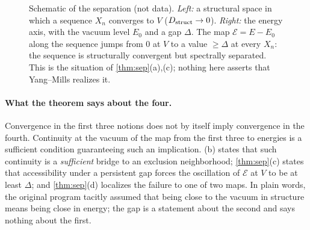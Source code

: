 \documentclass[11pt,a4paper]{article}
\theoremstyle{definition}
\theoremstyle{remark}
\begin{document}
\begin{figure}[t]
\centering
{}
\caption{Schematic of the separation (not data). \emph{Left:} a structural space in which a sequence $X_n$ converges to $V$ ($D_{\rm struct}\to0$). \emph{Right:} the energy axis, with the vacuum level $E_0$ and a gap $\Delta$. The map $\mathcal E=E-E_0$ along the sequence jumps from $0$ at $V$ to a value $\ge\Delta$ at every $X_n$: the sequence is structurally convergent but spectrally separated. This is the situation of \cref{thm:sep}(a),(c); nothing here asserts that Yang--Mills realizes it.}\label{fig:top}
\end{figure}

\paragraph{What the theorem says about the four.} Convergence in the first three notions does not by itself imply convergence in the fourth. Continuity at the vacuum of the map from the first three to energies is a sufficient condition guaranteeing such an implication. (b) states that such continuity is a \emph{sufficient} bridge to an exclusion neighborhood; \cref{thm:sep}(c) states that accessibility under a persistent gap forces the oscillation of $\mathcal E$ at $V$ to be at least $\Delta$; and \cref{thm:sep}(d) localizes the failure to one of two maps. In plain words, the original program tacitly assumed that being close to the vacuum in structure means being close in energy; the gap is a statement about the second and says nothing about the first.
\end{document}

